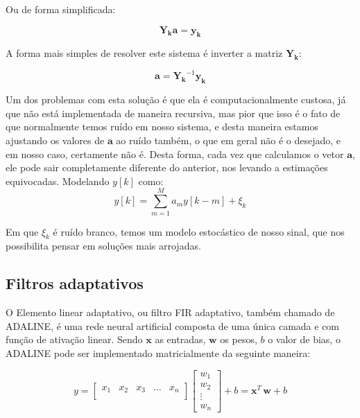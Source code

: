 \documentclass[a4paper, 12pt]{book}
\begin{document}
Ou de forma simplificada:

\begin{equation}
\boldsymbol{Y_k}\boldsymbol{a}=\boldsymbol{y_k}
\end{equation}

A forma mais simples de resolver este sistema é inverter a matriz $\boldsymbol{Y_k}$:

\begin{equation}
\boldsymbol{a}=\boldsymbol{Y_k}^{-1}\boldsymbol{y_k}
\end{equation}

Um dos problemas com esta solução é que ela é computacionalmente custosa, já  que não está implementada de maneira recursiva, mas pior que isso é o fato de que normalmente temos ruído em nosso sistema, e desta maneira estamos ajustando os valores de $\boldsymbol{a}$ ao ruído também, o que em geral não é o desejado, e em nosso caso, certamente não é. Desta forma, cada vez que calculamos o vetor $\boldsymbol{a}$, ele pode sair completamente diferente do anterior, nos levando a estimações equivocadas. Modelando $y[k]$ como:
\begin{equation}
y[k]=\sum_{m=1}^{M}a_m y[k-m]+\xi_k
\end{equation}

Em que $\xi_k$ é ruído branco, temos um modelo estocástico de nosso sinal, que nos possibilita pensar em soluções mais arrojadas. 

\subsection{Filtros adaptativos}

\indent O Elemento linear adaptativo, ou filtro FIR adaptativo, também chamado de ADALINE, é uma rede neural artificial composta de uma única camada e com função de ativação linear. Sendo $\boldsymbol{x}$ as entradas, $\boldsymbol{w}$ os pesos, $b$ o valor de bias, o ADALINE pode ser implementado matricialmente da seguinte maneira:


\begin{equation}
y=
\begin{bmatrix}
x_{1} & x_{2} & x_{3} & \dots & x_{n} \\
\end{bmatrix}
\begin{bmatrix}
w_{1}  \\
w_{2}  \\
\vdots  \\
w_{n} 
\end{bmatrix}
+ b = \boldsymbol{x}^T \, \boldsymbol{w}+b
\end{equation}
\end{document}
